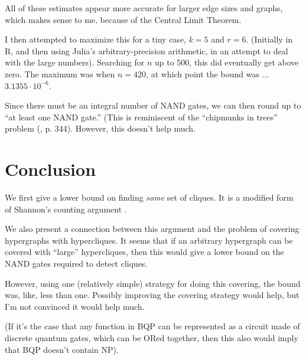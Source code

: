 \documentclass[12pt]{article}
\theoremstyle{definition}
\begin{document}
All of these
estimates appear more accurate for larger edge sizes and graphs, which
makes sense to me, because of the Central Limit Theorem.

I then attempted to maximize this for a tiny case, $k=5$ and $r=6$.
(Initially in R, and then using Julia's arbitrary-precision arithmetic,
in an attempt to deal with the large numbers). Searching for $n$ up to 500,
this did eventually get above zero.
The maximum was when $n=420$, at which point the bound was
... $3.1355 \cdot 10^{-6}$.

Since there must be an integral number of NAND gates, we can then round up
to ``at least one NAND gate.''
(This is reminiscent of the ``chipmunks in trees''
problem (\cite{ross2006first}, p. 344). However, this doesn't help much.

\section{Conclusion}

We first give a lower bound on finding {\em some} set of cliques.
It is a modified form of Shannon's counting argument
\cite{shannon_synthesis_1949}.

We also present a connection between this argument and the problem of covering
hypergraphs with hypercliques.
It seems that if an arbitrary hypergraph can be covered with 
``large'' hypercliques,
then this would give a lower bound on the NAND gates required to
detect cliques.

However, using one (relatively simple) strategy for doing this covering,
the bound was, like, less than one. Possibly improving the covering
strategy would help, but I'm not convinced it would help much.

(If it's the case that any function in BQP can be represented
as a circuit made of discrete quantum gates, which can be
ORed together, then this also
would imply that BQP doesn't contain NP).



\end{document}
